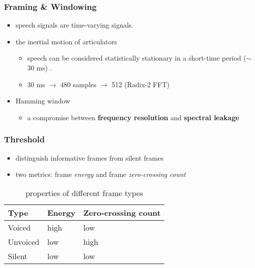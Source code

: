 \begin{frame}
\frametitle{Framing \& Windowing}
\begin{itemize}
	\item speech signals are time-varying signals.
	\item the inertial motion of articulators
	\begin{itemize}
		\item speech can be considered statistically stationary in a short-time period ($\sim$ 30 ms) \cite{brandstein1995practical}.
		\item 30 ms $\longrightarrow$ 480 samples $\longrightarrow$ 512 (Radix-2 FFT)
	\end{itemize}
	\item Hamming window
	\begin{itemize}
		\item a compromise between \textbf{frequency resolution} and \textbf{spectral leakage}
	\end{itemize}
\end{itemize}
\end{frame}


\begin{frame}
\frametitle{Threshold}
\begin{itemize}
\item distinguish informative frames from silent frames
\item two metrics: frame \textit{energy} and frame \textit{zero-crossing count}
\end{itemize}

\begin{table}[H]
\centering
\caption{properties of different frame types}
\begin{tabu} to 0.9\textwidth {X[c]X[c]X[c]}
\toprule
Type &Energy &Zero-crossing count\\
\hline
Voiced &high &low\\
\hline
Unvoiced &low &high\\
\hline
Silent &low &low\\
\bottomrule
\end{tabu}
\end{table}
\end{frame}


